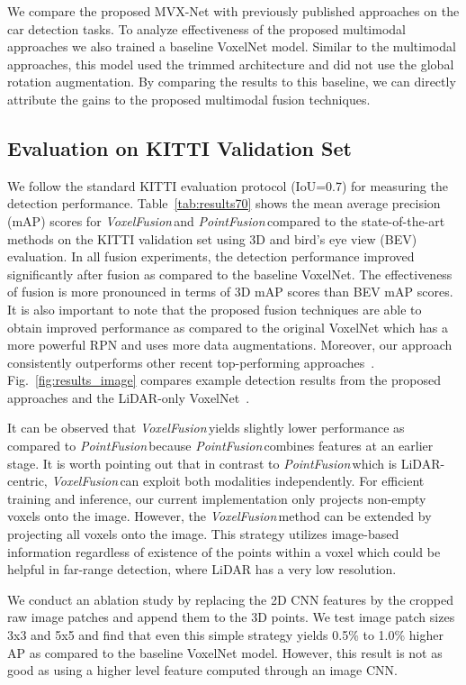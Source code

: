 \documentclass[letterpaper, 10 pt, conference]{ieeeconf}
\newcommand{\PF}{\textit{PointFusion}}
\newcommand{\VF}{\textit{VoxelFusion}}
\begin{document}
We compare the proposed MVX-Net with previously published approaches on the car detection tasks. To analyze effectiveness of the proposed multimodal approaches we also trained a baseline VoxelNet model. Similar to the multimodal approaches, this model used the trimmed architecture and did not use the global rotation augmentation. By comparing the results to this baseline, we can directly attribute the gains to the proposed multimodal fusion techniques. \\

\subsection{Evaluation on KITTI Validation Set}
\label{ssec:validationset}
We follow the standard KITTI evaluation protocol (IoU=0.7) for measuring the detection performance. Table~\ref{tab:results70} shows the mean average precision (mAP) scores for \VF{\,}and \PF{\,}compared to the state-of-the-art methods on the KITTI validation set using 3D and bird's eye view (BEV) evaluation. In all fusion experiments, the detection performance improved significantly after fusion as compared to the baseline VoxelNet. The effectiveness of fusion is more pronounced in terms of 3D mAP scores than BEV mAP scores. It is also important to note that the proposed fusion techniques are able to obtain improved performance as compared to the original VoxelNet which has a more powerful RPN and uses more data augmentations. Moreover, our approach consistently outperforms other recent top-performing approaches~\cite{REF:cvpr17chen,Yang2018CVPR,REF:qi2017frustum}. Fig.~\ref{fig:results_image} compares example detection results from the proposed approaches and the LiDAR-only VoxelNet~\cite{REF:zhou2017voxelnet}. 

It can be observed that \VF{\,}yields slightly lower performance as compared to \PF{\,}because \PF{\,}combines features at an earlier stage. It is worth pointing out that in contrast to \PF{\,}which is LiDAR-centric, \VF{\,}can exploit both modalities independently. For efficient training and inference, our current implementation only projects non-empty voxels onto the image. However, the \VF{\,}method can be extended by projecting all voxels onto the image. This strategy utilizes image-based information regardless of existence of the points within a voxel which could be helpful in far-range detection, where LiDAR has a very low resolution.


We conduct an ablation study by replacing the 2D CNN features by the cropped raw image patches and append them to the 3D points. We test image patch sizes 3x3 and 5x5 and find that even this simple strategy yields 0.5\% to 1.0\% higher AP as compared to the baseline VoxelNet model. However, this result is not as good as using a higher level feature computed through an image CNN.
\end{document}
